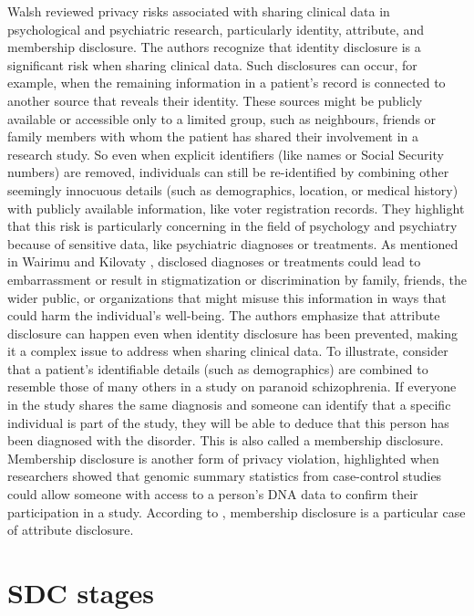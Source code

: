 \documentclass{article}
\begin{document}
Walsh \cite{2018_Walsh} reviewed privacy risks associated with sharing clinical data in psychological and psychiatric research, particularly identity, attribute, and membership disclosure. The authors recognize that identity disclosure is a significant risk when sharing clinical data. Such disclosures can occur, for example, when the remaining information in a patient's record is connected to another source that reveals their identity. These sources might be publicly available or accessible only to a limited group, such as neighbours, friends or family members with whom the patient has shared their involvement in a research study. So even when explicit identifiers (like names or Social Security numbers) are removed, individuals can still be re-identified by combining other seemingly innocuous details (such as demographics, location, or medical history) with publicly available information, like voter registration records.
They highlight that this risk is particularly concerning in the field of psychology and psychiatry because of sensitive data, like psychiatric diagnoses or treatments. 
As mentioned in Wairimu \cite{2022_Wairimu} and Kilovaty \cite{2021_Kilovaty}, disclosed diagnoses or treatments could lead to embarrassment or result in stigmatization or discrimination by family, friends, the wider public, or organizations that might misuse this information in ways that could harm the individual’s well-being.
The authors emphasize that attribute disclosure can happen even when identity disclosure has been prevented, making it a complex issue to address when sharing clinical data. To illustrate, consider that a patient's identifiable details (such as demographics) are combined to resemble those of many others in a study on paranoid schizophrenia. If everyone in the study shares the same diagnosis and someone can identify that a specific individual is part of the study, they will be able to deduce that this person has been diagnosed with the disorder. This is also called a membership disclosure.
Membership disclosure is another form of privacy violation, highlighted when researchers showed that genomic summary statistics from case-control studies could allow someone with access to a person's DNA data to confirm their participation in a study. According to \cite{2017_Templ}, membership disclosure is a particular case of attribute disclosure.


\section{SDC stages}
\end{document}
